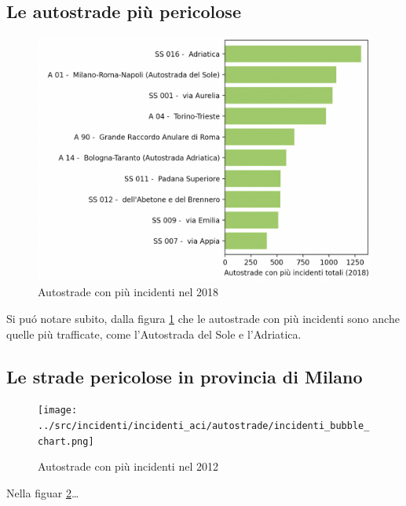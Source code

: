 \documentclass[a4paper]{report}
\begin{document}
\subsection{Le autostrade più pericolose}
\begin{figure}
    \includegraphics[width=\linewidth]{../src/incidenti/incidenti_aci/autostrade/autostrade.png}
    \caption{Autostrade con più incidenti nel 2018}
    \label{fig:incidenti-autostrade}
\end{figure}

Si pu\'o notare subito, dalla figura \ref{fig:incidenti-autostrade} che le autostrade con 
più incidenti sono anche quelle più trafficate, come l'Autostrada del Sole e l'Adriatica.



\subsection{Le strade pericolose in provincia di Milano}

\begin{figure}
    \texttt{[image: ../src/incidenti/incidenti\_aci/autostrade/incidenti\_bubble\_chart.png]}
    \caption{Autostrade con più incidenti nel 2012}
    \label{fig:bubble-incidenti-milano}
\end{figure}

Nella figuar \ref{fig:bubble-incidenti-milano}\dots


\end{document}
